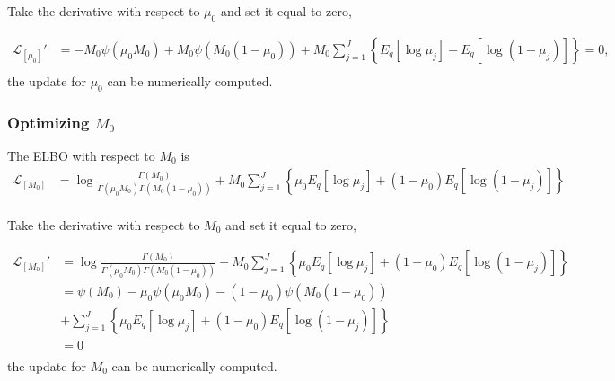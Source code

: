 \documentclass[11pt,reqno]{amsart}
\begin{document}
Take the derivative with respect to $ \mu_0 $ and set it equal to zero,

\begin{equation}
\begin{split}
\label{mu_0}
\mathcal{L}_{[\mu_0]}' 
&= -M_0 \psi(\mu_0 M_0) + M_0 \psi(M_0 (1-\mu_0)) 
+ M_0\sum_{j=1}^{J} \left\lbrace E_q  \left[ \log \mu_j \right] 
- E_q  \left[ \log (1 - \mu_j)\right]\right\rbrace =0 , \\
\end{split}
\end{equation}
the update for $ \mu_0 $ can be numerically computed.

\subsubsection{Optimizing $ M_0 $}
The ELBO with respect to $ M_0 $ is
\begin{equation}
\begin{split}
\label{M_0}
\mathcal{L}_{[M_0]} 
&= \log \frac{ \Gamma(M_0) } { \Gamma(\mu_0 M_0) \Gamma(M_0 (1-\mu_0))}  
+ M_0 \sum_{j=1}^{J} \left\lbrace \mu_0E_q  \left[ \log \mu_j \right] + ( 1 - \mu_0) E_q  \left[ \log (1 - \mu_j)\right]\right\rbrace  \\
\end{split}
\end{equation}

Take the derivative with respect to $ M_0 $ and set it equal to zero,

\begin{equation}
\begin{split}
\label{M_0}
\mathcal{L}_{[M_0]}' 
&= \log \frac{ \Gamma(M_0) } { \Gamma(\mu_0 M_0) \Gamma(M_0 (1-\mu_0))}  
+ M_0 \sum_{j=1}^{J} \left\lbrace \mu_0E_q  \left[ \log \mu_j \right] + ( 1 - \mu_0) E_q  \left[ \log (1 - \mu_j)\right]\right\rbrace  \\
&= \psi(M_0)  - \mu_0 \psi(\mu_0 M_0) - (1-\mu_0) \psi(M_0 (1-\mu_0))  \\
\quad &+ \sum_{j=1}^{J} \left\lbrace \mu_0E_q  \left[ \log \mu_j \right] + ( 1 - \mu_0) E_q  \left[ \log (1 - \mu_j)\right]\right\rbrace \\
&=0 \\
\end{split}
\end{equation}
the update for $ M_0 $ can be numerically computed.
\end{document}
